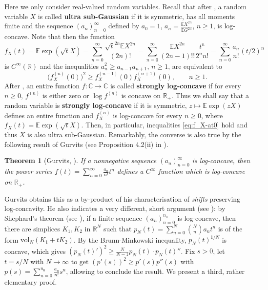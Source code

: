 \documentclass[10pt]{article}
\newcommand{\E}{\mathbb{E}}
\newcommand{\1}{\textbf{1}}
\newcommand{\R}{\mathbb{R}}
\newcommand{\C}{\mathbb{C}}
\newtheorem{theorem}{Theorem}
\theoremstyle{remark}
\theoremstyle{definition}
\begin{document}
Here we only consider real-valued random variables.
Recall that after \cite{NO}, a random variable $X$ is called \textbf{ultra sub-Gaussian} if it is symmetric, has all moments finite and the sequence $(a_n)_{n=0}^\infty$ defined by $a_0 = 1$, $a_n = \frac{\E X^{2n}}{\E G^{2n}}$, $n \geq 1$, is log-concave.  Note that then the function
\[
f_X(t) = \E \exp(\sqrt{t}X) = \sum_{n=0}^\infty \frac{\sqrt{t}^{2n}\E X^{2n}}{(2n)!} = \sum_{n=0}^\infty \frac{\E X^{2n}}{(2n-1)!!}\frac{t^n}{2^nn!} = \sum_{n=0}^\infty \frac{a_n}{n!}(t/2)^n
\]
is $C^\infty(\R)$ and the inequalities $a_n^2 \geq a_{n-1}a_{n+1}$, $n \geq 1$, are equivalent to
\begin{equation}\label{eq:f_X-at0}
\big(f_X^{(n)}(0)\big)^2 \geq f_X^{(n-1)}(0)f_X^{(n+1)}(0), \qquad n \geq 1.
\end{equation}
After \cite{Gur}, an entire function $f\colon \C\to\C$ is called \textbf{strongly log-concave} if for every $n \geq 0$, $f^{(n)}$ is either zero or $\log f^{(n)}$ is concave on $\R_+$. Thus we shall say that a random variable is \textbf{strongly log-concave} if it is symmetric, $z \mapsto \E\exp(zX)$ defines an entire function and $f_X^{(n)}$ is log-concave for every $n \geq 0$, where $f_X(t) = \E\exp(\sqrt{t}X)$. Then, in particular, inequalities \eqref{eq:f_X-at0} hold and thus $X$ is also ultra sub-Gaussian. Remarkably, the converse is also true by the following result of Gurvits (see Proposition 4.2(ii) in \cite{Gur}).

\begin{theorem}[Gurvits, \cite{Gur}]\label{thm:Gur}
If a nonnegative sequence $(a_n)_{n=0}^\infty$ is log-concave, then the power series $f(t) = \sum_{n=0}^\infty \frac{a_n}{n!}t^n$ defines a $C^\infty$ function which is log-concave on $\R_+$.
\end{theorem}

Gurvits obtains this as a by-product of his characterisation of \emph{shifts} preserving log-concavity. He also indicates a very different, short argument (see \cite{Gur, Gur2}): by Shephard's theorem (see \cite{Sh}), if a finite sequence $(a_n)_{n=0}^{n_0}$ is log-concave, then there are simplices $K_1, K_2$ in $\R^N$ such that $p_N(t) = \sum_{n=0}^N \binom{N}{n}a_nt^n$ is of the form $\text{vol}_N(K_1+tK_2)$. By the Brunn-Minkowski inequality, $p_N(t)^{1/N}$ is concave, which gives $(p_N(t)')^2 \geq \frac{N}{N-1}p_N(t)\cdot p_N(t)''$. Fix $s > 0$, let $t = s/N$ with $N \to \infty$ to get $(p'(s))^2 \geq p'(s)p''(s)$ with $p(s) = \sum_{n=0}^{n_0} \frac{a_n}{n!}s^n$, allowing to conclude the result. We present a third, rather elementary proof.
\end{document}
